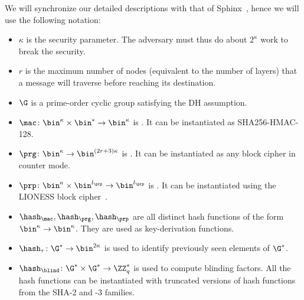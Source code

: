 \NewVariable*{\mac}{\mu}
\NewVariable*{\prg}{\rho}
\NewVariable*{\prp}{\pi}
\NewVariable*{\nullnode}{\varepsilon}
\NewVariable{\rdvnode}{*}

We will synchronize our detailed descriptions with that of 
Sphinx~\cite{Sphinx}, hence we will use the following notation:
\begin{itemize}
  \item \(\kappa\) is the security parameter.
    The adversary must thus do about \(2^\kappa\) work to break the security.

  \item \(r\) is the maximum number of nodes (\ie equivalent to the number of 
    layers) that a message will traverse before reaching its destination.

  \item \(\G\) is a prime-order cyclic group satisfying the \ac{DH} assumption.

  \item \(\mac\colon \bin^\kappa\times \bin^*\to \bin^\kappa\) is .
    It can be instantiated as \eg SHA256-HMAC-128.

  \item \(\prg\colon \bin^\kappa\to \bin^{(2r+3)\kappa}\) is .
    It can be instantiated as any block cipher in counter mode.

  \item \(\prp\colon \bin^\kappa\times \bin^{l_\prp} \to \bin^{l_\prp}\) is 
    .
    It can be instantiated using the LIONESS block cipher~\cite{LIONESS}.

  \item \(\hash_\mac, \hash_\prg, \hash_\prp\) are all distinct hash functions 
    of the form \(\bin^\kappa\to \bin^\kappa\).
    They are used as key-derivation functions.

  \item \(\hash_\tau\colon \G^*\to \bin^{2\kappa}\) is used to identify 
    previously seen elements of \(\G^*\).

  \item \(\hash_\blind\colon \G^*\times \G^*\to \ZZ_q^*\) is used to compute 
    blinding factors.
    All the hash functions can be instantiated with truncated versions of hash 
    functions from the SHA-2 and -3 families.


\end{itemize}
